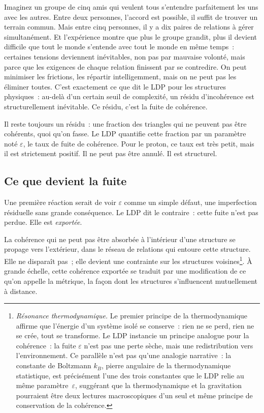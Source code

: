 \documentclass[12pt, a4paper, openright]{book}
\begin{document}
\medskip

Imaginez un groupe de cinq amis qui veulent tous s'entendre parfaitement les uns avec les autres. Entre deux personnes, l'accord est possible, il suffit de trouver un terrain commun. Mais entre cinq personnes, il y a dix paires de relations à gérer simultanément. Et l'expérience montre que plus le groupe grandit, plus il devient difficile que tout le monde s'entende avec tout le monde en même temps~: certaines tensions deviennent inévitables, non pas par mauvaise volonté, mais parce que les exigences de chaque relation finissent par se contredire. On peut minimiser les frictions, les répartir intelligemment, mais on ne peut pas les éliminer toutes. C'est exactement ce que dit le LDP pour les structures physiques~: au-delà d'un certain seuil de complexité, un résidu d'incohérence est structurellement inévitable. Ce résidu, c'est la fuite de cohérence.

\medskip

Il reste toujours un résidu~: une fraction des triangles qui ne peuvent pas être cohérents, quoi qu'on fasse. Le LDP quantifie cette fraction par un paramètre noté $\varepsilon$, le taux de fuite de cohérence. Pour le proton, ce taux est très petit, mais il est strictement positif. Il ne peut pas être annulé. Il est structurel.

\subsection*{Ce que devient la fuite}

Une première réaction serait de voir $\varepsilon$ comme un simple défaut, une imperfection résiduelle sans grande conséquence. Le LDP dit le contraire~: cette fuite n'est pas perdue. Elle est \emph{exportée}.

\medskip

La cohérence qui ne peut pas être absorbée à l'intérieur d'une structure se propage vers l'extérieur, dans le réseau de relations qui entoure cette structure. Elle ne disparaît pas~; elle devient une contrainte sur les structures voisines\footnote{\textit{Résonance thermodynamique.} Le premier principe de la thermodynamique affirme que l'énergie d'un système isolé se conserve~: rien ne se perd, rien ne se crée, tout se transforme. Le LDP instancie un principe analogue pour la cohérence~: la fuite $\varepsilon$ n'est pas une perte sèche, mais une redistribution vers l'environnement. Ce parallèle n'est pas qu'une analogie narrative~: la constante de Boltzmann $k_B$, pierre angulaire de la thermodynamique statistique, est précisément l'une des trois constantes que le LDP relie au même paramètre~$\varepsilon$, suggérant que la thermodynamique et la gravitation pourraient être deux lectures macroscopiques d'un seul et même principe de conservation de la cohérence.}. À grande échelle, cette cohérence exportée se traduit par une modification de ce qu'on appelle la métrique, la façon dont les structures s'influencent mutuellement à distance.
\end{document}
